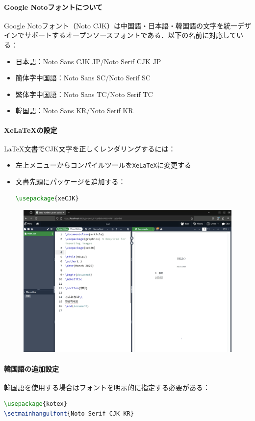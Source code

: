 \paragraph{Google Notoフォントについて}
Google Notoフォント（Noto CJK）は中国語・日本語・韓国語の文字を統一デザインでサポートするオープンソースフォントである．以下の名前に対応している：
\begin{itemize}
\item 日本語：Noto Sans CJK JP/Noto Serif CJK JP
\item 簡体字中国語：Noto Sans SC/Noto Serif SC
\item 繁体字中国語：Noto Sans TC/Noto Serif TC
\item 韓国語：Noto Sans KR/Noto Serif KR
\end{itemize}

\paragraph{XeLaTeXの設定}
\LaTeX 文書でCJK文字を正しくレンダリングするには：
\begin{itemize}
\item 左上メニューからコンパイルツールを\texttt{XeLaTeX}に変更する
\item 文書先頭にパッケージを追加する：
\begin{lstlisting}[language=TeX]
\usepackage{xeCJK}
\end{lstlisting}
\end{itemize}

\begin{figure}[H]
    \centering
    \includegraphics[width=0.8\linewidth]{images/Pasted image 20250307175237.png}
\end{figure}

\paragraph{韓国語の追加設定}
韓国語を使用する場合はフォントを明示的に指定する必要がある：
\begin{lstlisting}[language=TeX]
\usepackage{kotex}
\setmainhangulfont{Noto Serif CJK KR}
\end{lstlisting}

